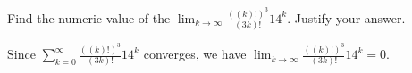 \documentclass[12pt,fleqn,answers]{exam}
\begin{document}
\begin{questions}
\begin{parts}
\begin{solution}[4.50in]
    \end{solution}
        
   
\end{parts}


\question [1] Find the numeric value of the $\displaystyle \lim_{k \to \infty} \frac{ ((k)!)^3}{(3 k)!} 14^k$.  Justify your answer.

Since  $\sum_{k=0}^\infty \frac{ ((k)!)^3}{(3 k)!} 14^k$ converges, we have  $\displaystyle \lim_{k \to \infty} \frac{ ((k)!)^3}{(3 k)!} 14^k = 0$.
\end{questions}
\end{document}
